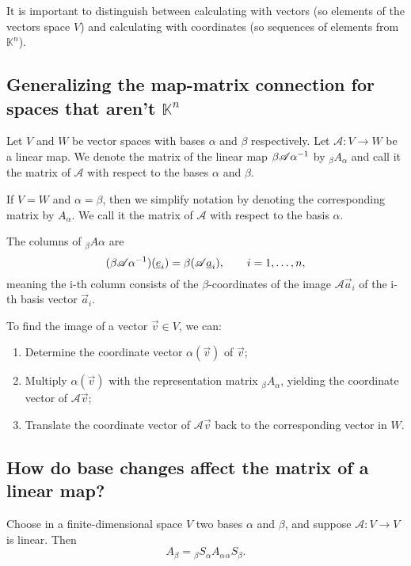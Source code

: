 \begin{remark}
    It is important to distinguish between calculating with vectors (so elements of the vectors space $V$) and calculating
    with coordinates (so sequences of elements from $\mathbb{K}^n$).
\end{remark}

\subsection{Generalizing the map-matrix connection for spaces that aren't \texorpdfstring{$\mathbb{K}^n$}{K}}

\begin{definition}
    Let $V$ and $W$ be vector spaces with bases $\alpha$ and $\beta$ respectively. Let $\mathscr{A}: V \to W$ be a linear map.
    We denote the matrix of the linear map $\beta\mathscr{A}\alpha^{-1}$ by $_\beta A _\alpha$ and call it the matrix
    of $\mathscr{A}$ with respect to the bases $\alpha$ and $\beta$.
\end{definition}

\begin{remark}
    If $V = W$ and $\alpha = \beta$, then we simplify notation by denoting the corresponding matrix by $A_\alpha$.
    We call it the matrix of $\mathscr{A}$ with respect to the basis $\alpha$.
\end{remark}

\begin{remark}
    The columns of $_\beta A \alpha$ are
    $$(\beta\mathscr{A}\alpha^{-1})(\underline{e}_i) = \beta(\mathscr{A}\underline{a}_i), \qquad i = 1,\dots,n,$$
    meaning the i-th column consists of the $\beta$-coordinates of the image $\mathscr{A}\vec{a}_i$ of the i-th basis vector $\vec{a}_i$.
\end{remark}

\begin{remark}
    To find the image of a vector $\vec{v} \in V$, we can:
    \begin{enumerate}
        \item Determine the coordinate vector $\alpha(\vec{v})$ of $\vec{v}$;
        \item Multiply $\alpha(\vec{v})$ with the representation matrix $_\beta A _\alpha$, yielding the coordinate vector
            of $\mathscr{A}\vec{v}$;
        \item Translate the coordinate vector of $\mathscr{A}\vec{v}$ back to the corresponding vector in $W$.
    \end{enumerate}
\end{remark}

\subsection{How do base changes affect the matrix of a linear map?}

\begin{theorem}
    Choose in a finite-dimensional space $V$ two bases $\alpha$ and $\beta$, and suppose $\mathscr{A}: V \to V$ is linear. Then
    $$A_\beta = {_\beta S _\alpha} {A_\alpha} {_\alpha S _\beta}.$$
\end{theorem}

